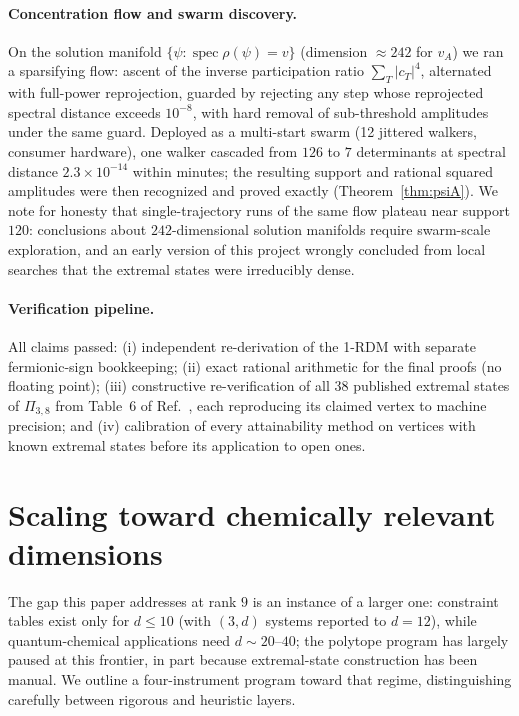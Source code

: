 \documentclass[11pt]{article}
\begin{document}
\paragraph{Concentration flow and swarm discovery.}
On the solution manifold $\{\psi : \operatorname{spec}\rho(\psi) = v\}$
(dimension $\approx 242$ for $v_A$) we ran a sparsifying flow: ascent of the
inverse participation ratio $\sum_T |c_T|^4$, alternated with full-power
reprojection, guarded by rejecting any step whose reprojected spectral
distance exceeds $10^{-8}$, with hard removal of sub-threshold amplitudes
under the same guard. Deployed as a multi-start swarm (12 jittered walkers,
consumer hardware), one walker cascaded from $126$ to $7$ determinants at
spectral distance $2.3\times10^{-14}$ within minutes; the resulting support
and rational squared amplitudes were then recognized and proved exactly
(Theorem~\ref{thm:psiA}). We note for honesty that single-trajectory runs of
the same flow plateau near support $120$: conclusions about
$242$-dimensional solution manifolds require swarm-scale exploration, and an
early version of this project wrongly concluded from local searches that the
extremal states were irreducibly dense.

\paragraph{Verification pipeline.}
All claims passed: (i) independent re-derivation of the 1-RDM with separate
fermionic-sign bookkeeping; (ii) exact rational arithmetic for the final
proofs (no floating point); (iii) constructive re-verification of all $38$
published extremal states of $\Pi_{3,8}$ from Table~6 of
Ref.~\cite{AK2008}, each reproducing its claimed vertex to machine
precision; and (iv) calibration of every attainability method on vertices
with known extremal states before its application to open ones.

\section{Scaling toward chemically relevant dimensions}
\label{sec:scaling}
The gap this paper addresses at rank $9$ is an instance of a larger one:
constraint tables exist only for $d \le 10$ (with $(3,d)$ systems reported to
$d = 12$), while quantum-chemical applications need $d \sim 20$--$40$; the
polytope program has largely paused at this frontier, in part because
extremal-state construction has been manual. We outline a four-instrument
program toward that regime, distinguishing carefully between rigorous and
heuristic layers.
\end{document}
